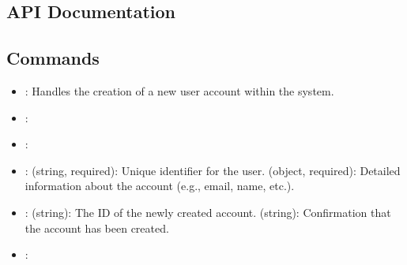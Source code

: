 \documentclass[letterpaper,10pt,english]{sphinxmanual}
\begin{document}


\subsection{API Documentation}
\label{\detokenize{administration_concession_system/accounts_summary_service:api-documentation}}

\subsection{Commands}
\label{\detokenize{administration_concession_system/accounts_summary_service:commands}}
\sphinxAtStartPar
{}
\begin{itemize}
\item {} 
\sphinxAtStartPar
{}: Handles the creation of a new user account within the system.

\item {} 
\sphinxAtStartPar
{}: 

\item {} 
\sphinxAtStartPar
{}: 

\item {} 
\sphinxAtStartPar
{}:
\sphinxhyphen{}  (string, required): Unique identifier for the user.
\sphinxhyphen{}  (object, required): Detailed information about the account (e.g., email, name, etc.).

\item {} 
\sphinxAtStartPar
{}:
\sphinxhyphen{}  (string): The ID of the newly created account.
\sphinxhyphen{}  (string): Confirmation that the account has been created.

\item {} 
\sphinxAtStartPar
{}: 

\end{itemize}
\end{document}
